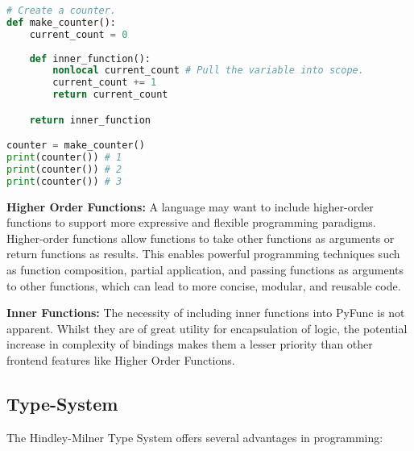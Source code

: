 \documentclass{l4proj}
\begin{document}
\begin{lstlisting}[language=Python, caption={An example of a closure in Python. See the use of the 'nonlocal' keyword to pull the surrounding defintion of 'current\_count' into the scope of 'inner\_function'.}, label={lst:py-closure}]
# Create a counter.
def make_counter():
    current_count = 0
    
    def inner_function():
        nonlocal current_count # Pull the variable into scope.
        current_count += 1
        return current_count

    return inner_function

counter = make_counter()
print(counter()) # 1
print(counter()) # 2
print(counter()) # 3
\end{lstlisting}


\textbf{Higher Order Functions:}
A language may want to include higher-order functions to support more expressive and flexible programming paradigms. 
Higher-order functions allow functions to take other functions as arguments or return functions as results.
This enables powerful programming techniques such as function composition, partial application, and passing functions as arguments to other functions, which can lead to more concise, modular, and reusable code.

\textbf{Inner Functions:}
The necessity of including inner functions into PyFunc is not apparent.
Whilst they are of great utility for encapsulation of logic, the potential increase in complexity of bindings makes them a lesser priority than other frontend features like Higher Order Functions.

\subsection{Type-System}
The Hindley-Milner Type System offers several advantages in programming:
\end{document}
